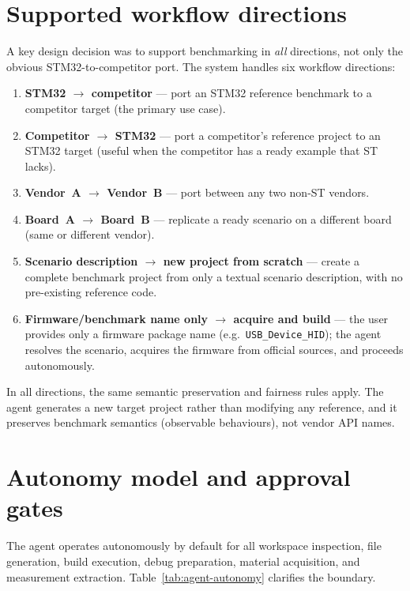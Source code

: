 \section{Supported workflow directions}
\label{sec:agent-directions}

A key design decision was to support benchmarking in \emph{all} directions, not only the
obvious STM32-to-competitor port. The system handles six workflow directions:

\begin{enumerate}
\item \textbf{STM32 $\to$ competitor} --- port an STM32 reference benchmark to a competitor target (the primary use case).
\item \textbf{Competitor $\to$ STM32} --- port a competitor's reference project to an STM32 target (useful when the competitor has a ready example that ST lacks).
\item \textbf{Vendor~A $\to$ Vendor~B} --- port between any two non-ST vendors.
\item \textbf{Board~A $\to$ Board~B} --- replicate a ready scenario on a different board (same or different vendor).
\item \textbf{Scenario description $\to$ new project from scratch} --- create a complete benchmark project from only a textual scenario description, with no pre-existing reference code.
\item \textbf{Firmware/benchmark name only $\to$ acquire and build} --- the user provides only a firmware package name (e.g.\ \texttt{USB\_Device\_HID}); the agent resolves the scenario, acquires the firmware from official sources, and proceeds autonomously.
\end{enumerate}

In all directions, the same semantic preservation and fairness rules apply. The agent
generates a new target project rather than modifying any reference, and it preserves
benchmark semantics (observable behaviours), not vendor API names.

\section{Autonomy model and approval gates}
\label{sec:agent-autonomy}

The agent operates autonomously by default for all workspace inspection, file generation,
build execution, debug preparation, material acquisition, and measurement extraction.
Table~\ref{tab:agent-autonomy} clarifies the boundary.


